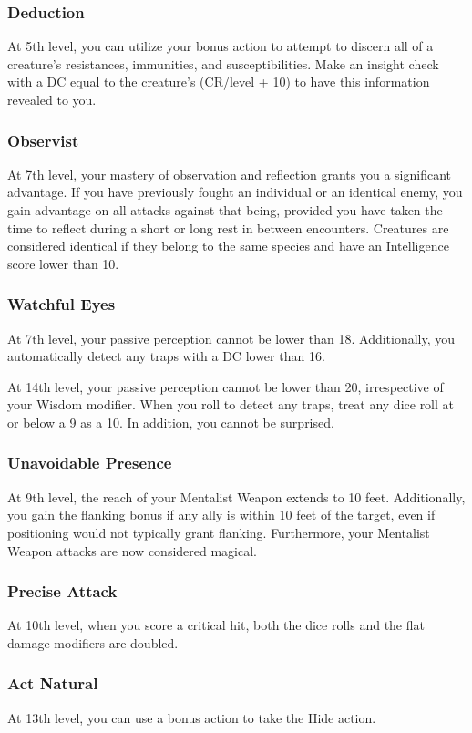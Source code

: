 \subsubsection{Deduction}
At 5th level, you can utilize your bonus action to attempt to discern all of a creature's resistances, immunities, and susceptibilities. Make an insight check with a DC equal to the creature’s (CR/level + 10) to have this information revealed to you.
\subsubsection{Observist}
At 7th level, your mastery of observation and reflection grants you a significant advantage. If you have previously fought an individual or an identical enemy, you gain advantage on all attacks against that being, provided you have taken the time to reflect during a short or long rest in between encounters. Creatures are considered identical if they belong to the same species and have an Intelligence score lower than 10.
\subsubsection{Watchful Eyes}
At 7th level, your passive perception cannot be lower than 18. Additionally, you automatically detect any traps with a DC lower than 16.

At 14th level, your passive perception cannot be lower than 20, irrespective of your Wisdom modifier. When you roll to detect any traps, treat any dice roll at or below a 9 as a 10. In addition, you cannot be surprised.
\subsubsection{Unavoidable Presence}
At 9th level, the reach of your Mentalist Weapon extends to 10 feet. Additionally, you gain the flanking bonus if any ally is within 10 feet of the target, even if positioning would not typically grant flanking. Furthermore, your Mentalist Weapon attacks are now considered magical.
\subsubsection{Precise Attack}
At 10th level, when you score a critical hit, both the dice rolls and the flat damage modifiers are doubled.
\subsubsection{Act Natural}
At 13th level, you can use a bonus action to take the Hide action.

